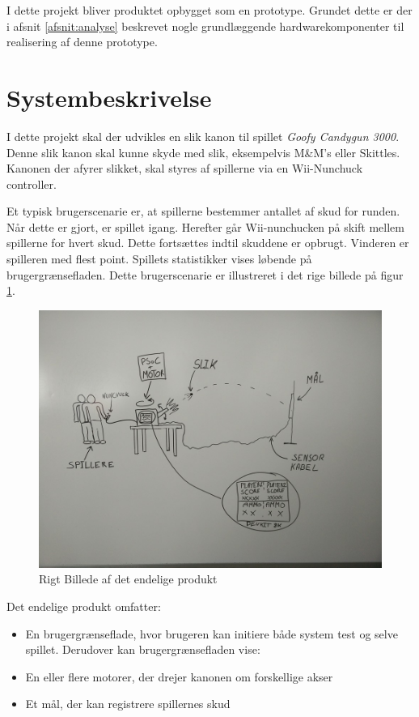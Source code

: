I dette projekt bliver produktet opbygget som en prototype. Grundet dette er der i afsnit \ref{afsnit:analyse} beskrevet nogle grundlæggende hardwarekomponenter til realisering af denne prototype.

\section{Systembeskrivelse}
\label{afsnit:systembeskrivelse}
I dette projekt skal der udvikles en slik kanon til spillet \textit{Goofy Candygun 3000}. Denne slik kanon skal kunne skyde med slik, eksempelvis M\&M’s eller Skittles. Kanonen der afyrer slikket, skal styres af spillerne via en Wii-Nunchuck controller. 

Et typisk brugerscenarie er, at spillerne bestemmer antallet af skud for runden. Når dette er gjort, er spillet igang. Herefter går Wii-nunchucken på skift mellem spillerne for hvert skud. Dette fortsættes indtil skuddene er opbrugt. Vinderen er spilleren med flest point. Spillets statistikker vises løbende på brugergrænsefladen. Dette brugerscenarie er illustreret i det rige billede på figur \ref{fig:RigtBillede}.

\begin{figure}[H]
	\centering
	\includegraphics[width=\textwidth]{Projektformulering/images/rigtBillede}
	\caption{Rigt Billede af det endelige produkt}
	\label{fig:RigtBillede}
\end{figure}

Det endelige produkt omfatter:
\begin{itemize}
	\item{En brugergrænseflade, hvor brugeren kan initiere både system test og selve spillet. Derudover kan brugergrænsefladen vise:}
	\item{En eller flere motorer, der drejer kanonen om forskellige akser}
	\item{Et mål, der kan registrere spillernes skud}
\end{itemize}


